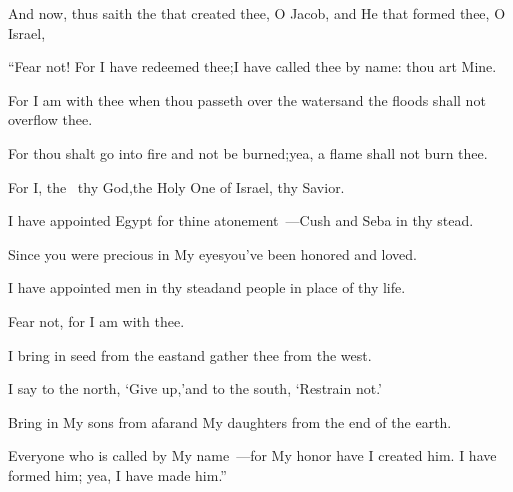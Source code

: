 
\begin{inparaenum}
  \pb{} And now, thus saith the \lord\pa{}that created thee, O Jacob, and He that formed thee, O Israel,%

  \pb{}``Fear not! For I have redeemed thee;\pa{}I have called thee by name: thou art Mine.%

  \pb{} For I am with thee when thou passeth over the waters\pa{}and the floods shall not overflow thee.%

  \pb{}For thou shalt go into fire and not be burned;\pa{}yea, a flame shall not burn thee.%

  \pc{} For I, the \lord\ thy God,\pa{}the Holy One of Israel, thy Savior.%

  \pb{}I have appointed Egypt for thine atonement~---\pa{}Cush and Seba in thy stead.%

  \pb{} Since you were precious in My eyes\pa{}you've been honored and loved.%

  \pb{}I have appointed men in thy stead\pa{}and people in place of thy life.%

  \pc{} Fear not, for I am with thee.%

  \pb{}I bring in seed from the east\pa{}and gather thee from the west.%

  \pb{} I say to the north, `Give up,'\pa{}and to the south, `Restrain not.'%

  \pb{}Bring in My sons from afar\pa{}and My daughters from the end of the earth.%

  \pb{} Everyone who is called by My name~---\pa{}for My honor have I created him. I have formed him; yea, I have made him.''%
\end{inparaenum}
